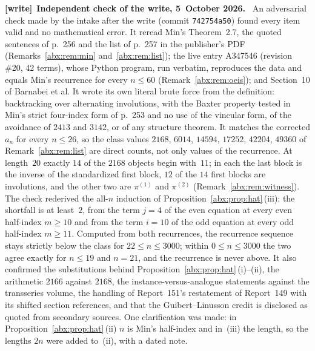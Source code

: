 \documentclass[11pt,letterpaper]{article}
\numberwithin{equation}{section}
\theoremstyle{remark}\newtheorem{remark}[theorem]{Remark}
\newcommand{\file}[1]{\nolinkurl{#1}}
\newenvironment{writenote}[1][]{\par\smallskip\begingroup\small
 \noindent\textbf{[write]}\if\relax\detokenize{#1}\relax\else~\textbf{#1.}\fi\ }%
 {\par\endgroup\smallskip}
\begin{document}
\begin{writenote}[Independent check of the write, 5~October 2026]
An adversarial check made by the intake after the write (commit \file{742754a50}) found every item valid and no mathematical error. It reread Min's Theorem~2.7, the quoted sentences of p.~256 and the list of p.~257 in the publisher's PDF (Remarks~\ref{abx:rem:min} and~\ref{abx:rem:list}); the live entry A347546 (revision \#20, 42 terms), whose Python program, run verbatim, reproduces the data and equals Min's recurrence for every $n\le60$ (Remark~\ref{abx:rem:oeis}); and Section~10 of Barnabei et al. It wrote its own literal brute force from the definition: backtracking over alternating involutions, with the Baxter property tested in Min's strict four-index form of p.~253 and no use of the vincular form, of the avoidance of $2413$ and $3142$, or of any structure theorem. It matches the corrected $a_n$ for every $n\le26$, so the class values $2168$, $6014$, $14594$, $17252$, $42204$, $49360$ of Remark~\ref{abx:rem:list} are direct counts, not only values of the recurrence. At length~$20$ exactly $14$ of the $2168$ objects begin with~$11$; in each the last block is the inverse of the standardized first block, $12$ of the $14$ first blocks are involutions, and the other two are $\pi^{(1)}$ and $\pi^{(2)}$ (Remark~\ref{abx:rem:witness}). The check rederived the all-$n$ induction of Proposition~\ref{abx:prop:hat}\,(iii): the shortfall is at least~$2$, from the term $j=4$ of the even equation at every even half-index $m\ge10$ and from the term $i=10$ of the odd equation at every odd half-index $m\ge11$. Computed from both recurrences, the recurrence sequence stays strictly below the class for $22\le n\le3000$; within $0\le n\le3000$ the two agree exactly for $n\le19$ and $n=21$, and the recurrence is never above. It also confirmed the substitutions behind Proposition~\ref{abx:prop:hat}\,(i)--(ii), the arithmetic $2166$ against $2168$, the instance-versus-analogue statements against the transseries volume, the handling of Report~151's restatement of Report~149 with its shifted section references, and that the Guibert--Linusson credit is disclosed as quoted from secondary sources. One clarification was made: in Proposition~\ref{abx:prop:hat}\,(ii) $n$ is Min's half-index and in~(iii) the length, so the lengths $2n$ were added to~(ii), with a dated note.
\end{writenote}
\end{document}
